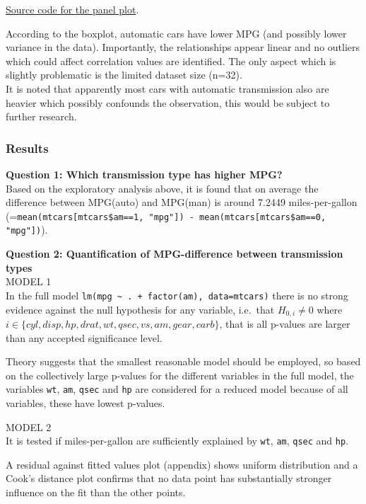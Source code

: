 \documentclass[]{article}
\begin{document}
\href{https://github.com/mzhKU/regmods_course_project/blob/master/multiplot.R}{Source
code for the panel plot}.

According to the boxplot, automatic cars have lower MPG (and possibly
lower variance in the data). Importantly, the relationships appear
linear and no outliers which could affect correlation values are
identified. The only aspect which is slightly problematic is the limited
dataset size (n=32).\\It is noted that apparently most cars with
automatic transmission also are heavier which possibly confounds the
observation, this would be subject to further research.

\subsubsection{Results}\label{results}

\textbf{Question 1: Which transmission type has higher MPG?}\\Based on
the exploratory analysis above, it is found that on average the
difference between MPG(auto) and MPG(man) is around 7.2449
miles-per-gallon
(=\texttt{mean(mtcars{[}mtcars\$am==1, "mpg"{]}) - mean(mtcars{[}mtcars\$am==0, "mpg"{]})}).

\textbf{Question 2: Quantification of MPG-difference between
transmission types}\\MODEL 1\\In the full model
\texttt{lm(mpg \textasciitilde{} . + factor(am), data=mtcars)} there is
no strong evidence against the null hypothesis for any variable,
i.e.~that $H_{0, i} \neq 0$ where
$i \in \{cyl, disp, hp, drat, wt, qsec, vs, am, gear, carb\}$, that is
all p-values are larger than any accepted significance level.

Theory suggests that the smallest reasonable model should be employed,
so based on the collectively large p-values for the different variables
in the full model, the variables \texttt{wt}, \texttt{am}, \texttt{qsec}
and \texttt{hp} are considered for a reduced model because of all
variables, these have lowest p-values.

MODEL 2\\It is tested if miles-per-gallon are sufficiently explained by
\texttt{wt}, \texttt{am}, \texttt{qsec} and \texttt{hp}.

A residual against fitted values plot (appendix) shows uniform
distribution and a Cook's distance plot confirms that no data point has
substantially stronger influence on the fit than the other points.
\end{document}
